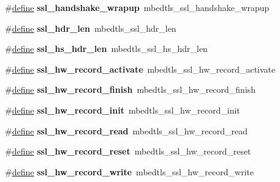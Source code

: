 \begin{DoxyCompactItemize}
\#\hyperlink{structdefine}{define} {\bfseries ssl\+\_\+handshake\+\_\+wrapup}~mbedtls\+\_\+ssl\+\_\+handshake\+\_\+wrapup
\item 
\mbox{\label{compat-1_83_8h_ace14e6ebee561667231298f3cadbe0e0}} 
\#\hyperlink{structdefine}{define} {\bfseries ssl\+\_\+hdr\+\_\+len}~mbedtls\+\_\+ssl\+\_\+hdr\+\_\+len
\item 
\mbox{\label{compat-1_83_8h_aa95621ea408c1ca646aebddc6f9f7ea4}} 
\#\hyperlink{structdefine}{define} {\bfseries ssl\+\_\+hs\+\_\+hdr\+\_\+len}~mbedtls\+\_\+ssl\+\_\+hs\+\_\+hdr\+\_\+len
\item 
\mbox{\label{compat-1_83_8h_affcc57154943f255af0a5ec66a9c82b6}} 
\#\hyperlink{structdefine}{define} {\bfseries ssl\+\_\+hw\+\_\+record\+\_\+activate}~mbedtls\+\_\+ssl\+\_\+hw\+\_\+record\+\_\+activate
\item 
\mbox{\label{compat-1_83_8h_affa8016c37d5bacf785e4eced6fec95d}} 
\#\hyperlink{structdefine}{define} {\bfseries ssl\+\_\+hw\+\_\+record\+\_\+finish}~mbedtls\+\_\+ssl\+\_\+hw\+\_\+record\+\_\+finish
\item 
\mbox{\label{compat-1_83_8h_af5ea620603c8e84bc201177427b30026}} 
\#\hyperlink{structdefine}{define} {\bfseries ssl\+\_\+hw\+\_\+record\+\_\+init}~mbedtls\+\_\+ssl\+\_\+hw\+\_\+record\+\_\+init
\item 
\mbox{\label{compat-1_83_8h_a75b7262bbe83f7641af6dec366d96f88}} 
\#\hyperlink{structdefine}{define} {\bfseries ssl\+\_\+hw\+\_\+record\+\_\+read}~mbedtls\+\_\+ssl\+\_\+hw\+\_\+record\+\_\+read
\item 
\mbox{\label{compat-1_83_8h_adbd6f37970b9a66838601a85838006e0}} 
\#\hyperlink{structdefine}{define} {\bfseries ssl\+\_\+hw\+\_\+record\+\_\+reset}~mbedtls\+\_\+ssl\+\_\+hw\+\_\+record\+\_\+reset
\item 
\mbox{\label{compat-1_83_8h_ab45b34839f7d123be3bf7cf076a68dc4}} 
\#\hyperlink{structdefine}{define} {\bfseries ssl\+\_\+hw\+\_\+record\+\_\+write}~mbedtls\+\_\+ssl\+\_\+hw\+\_\+record\+\_\+write
\item 
\mbox{\label{compat-1_83_8h_a1e72f3a491e6e5c45bdbe7a063a38695}} 

\end{DoxyCompactItemize}
